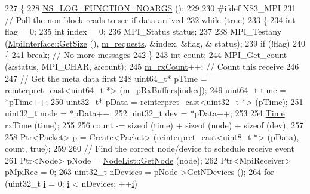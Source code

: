 \begin{DoxyCode}
227 \{ 
228   \hyperlink{log-macros-disabled_8h_a8f7e4afc291c9d29a65c18ac1f79197b}{NS\_LOG\_FUNCTION\_NOARGS} ();
229 
230 \textcolor{preprocessor}{#ifdef NS3\_MPI}
231   \textcolor{comment}{// Poll the non-block reads to see if data arrived}
232   \textcolor{keywordflow}{while} (\textcolor{keyword}{true})
233     \{
234       \textcolor{keywordtype}{int} flag = 0;
235       \textcolor{keywordtype}{int} index = 0;
236       MPI\_Status status;
237 
238       MPI\_Testany (\hyperlink{classns3_1_1MpiInterface_ab35c742e7e7ad3fa07cf0dbb92413c82}{MpiInterface::GetSize} (), \hyperlink{classns3_1_1GrantedTimeWindowMpiInterface_a6d0d65442212c4017dca88cb86a06069}{m\_requests}, &index, &flag, &
      status);
239       \textcolor{keywordflow}{if} (!flag)
240         \{
241           \textcolor{keywordflow}{break};        \textcolor{comment}{// No more messages}
242         \}
243       \textcolor{keywordtype}{int} count;
244       MPI\_Get\_count (&status, MPI\_CHAR, &count);
245       \hyperlink{classns3_1_1GrantedTimeWindowMpiInterface_ad7cdeaaf3923270223e0f735d4c95ad4}{m\_rxCount}++; \textcolor{comment}{// Count this receive}
246 
247       \textcolor{comment}{// Get the meta data first}
248       uint64\_t* pTime = \textcolor{keyword}{reinterpret\_cast<}uint64\_t *\textcolor{keyword}{>} (\hyperlink{classns3_1_1GrantedTimeWindowMpiInterface_a93d55e9d2243e6839d0944c6b5587f03}{m\_pRxBuffers}[index]);
249       uint64\_t time = *pTime++;
250       uint32\_t* pData = \textcolor{keyword}{reinterpret\_cast<}uint32\_t *\textcolor{keyword}{>} (pTime);
251       uint32\_t node = *pData++;
252       uint32\_t dev  = *pData++;
253 
254       \hyperlink{namespacens3_1_1TracedValueCallback_a7ffd3e7c142ffe7c8a1d2db9b8de38ec}{Time} rxTime (time);
255 
256       count -= \textcolor{keyword}{sizeof} (time) + \textcolor{keyword}{sizeof} (node) + \textcolor{keyword}{sizeof} (dev);
257 
258       Ptr<Packet> \hyperlink{lte__link__budget_8m_ac9de518908a968428863f829398a4e62}{p} = Create<Packet> (\textcolor{keyword}{reinterpret\_cast<}uint8\_t *\textcolor{keyword}{>} (pData), count, \textcolor{keyword}{true});
259 
260       \textcolor{comment}{// Find the correct node/device to schedule receive event}
261       Ptr<Node> pNode = \hyperlink{classns3_1_1NodeList_a80ac09977d48d29db5c704ac8483cf6c}{NodeList::GetNode} (node);
262       Ptr<MpiReceiver> pMpiRec = 0;
263       uint32\_t nDevices = pNode->GetNDevices ();
264       \textcolor{keywordflow}{for} (uint32\_t \hyperlink{bernuolliDistribution_8m_a6f6ccfcf58b31cb6412107d9d5281426}{i} = 0; \hyperlink{bernuolliDistribution_8m_a6f6ccfcf58b31cb6412107d9d5281426}{i} < nDevices; ++\hyperlink{bernuolliDistribution_8m_a6f6ccfcf58b31cb6412107d9d5281426}{i})

\end{DoxyCode}
